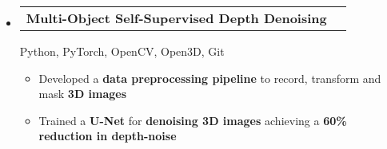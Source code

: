 \documentclass[letterpaper,11pt]{article}
\makeatletter
\newcounter{starnumber}
\newcommand{\stars}[1]{
  \forloop{starnumber}{1}{\value{starnumber} < 4}{
    \ifthenelse{#1 < \value{starnumber}}{\ding{73}}{\ding{72}}%
  }
}
\newcommand{\resumeItem}[1]{
  \item\small{
    {#1 \vspace{-2pt}}
  }
}
\newcommand{\resumeProjectHeading}[2]{
    \item
    \begin{tabular*}{0.97\textwidth}{l@{\extracolsep{\fill}}r}
      \small#1 & #2 \\
    \end{tabular*}\vspace{-7pt}
}
\newcommand{\resumeSubHeadingListStart}{\begin{itemize}[leftmargin=0.15in, label={}]}
\newcommand{\resumeSubHeadingListEnd}{\end{itemize}}
\newcommand{\resumeItemListStart}{\begin{itemize}[leftmargin=0.2in]}
\newcommand{\resumeItemListEnd}{\end{itemize}\vspace{-5pt}}
\makeatother
\begin{document}
\resumeSubHeadingListStart
\vspace{5pt}
\resumeProjectHeading
{\textbf{Multi-Object Self-Supervised Depth Denoising} \space {[Kienle \& Petri, 2022, arXiv:2305.05778]}\vspace{8pt}}{}
{\small{Python, PyTorch, OpenCV, Open3D, Git}}
\vspace*{-5pt}
\resumeItemListStart
\resumeItem{Developed a \textbf{data preprocessing pipeline} to record, transform and mask \textbf{3D images}}
\resumeItem{Trained a \textbf{U-Net} for \textbf{denoising 3D images} achieving a \textbf{60\% reduction in depth-noise}}
\resumeItemListEnd

\resumeSubHeadingListEnd

\vspace*{-5pt}


\end{document}
